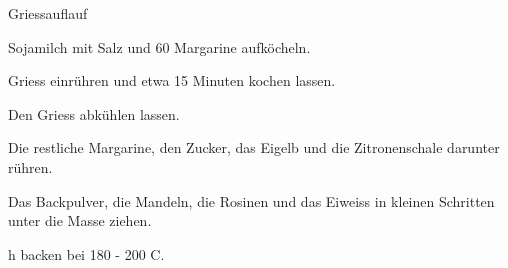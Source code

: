 
\begin{recipe}[]{Griessauflauf}{}{}



\step
Sojamilch mit Salz und 60 \g Margarine aufk\"ocheln.

\step
Griess einr\"uhren und etwa 15 Minuten kochen lassen.

\step
Den Griess abk\"uhlen lassen.

\step
Die restliche Margarine, den Zucker, das Eigelb und die Zitronenschale darunter r\"uhren.

\step
Das Backpulver, die Mandeln, die Rosinen und das Eiweiss in kleinen Schritten unter die Masse ziehen.

 h backen bei 180 - 200 \textdegree C.

\end{recipe}
